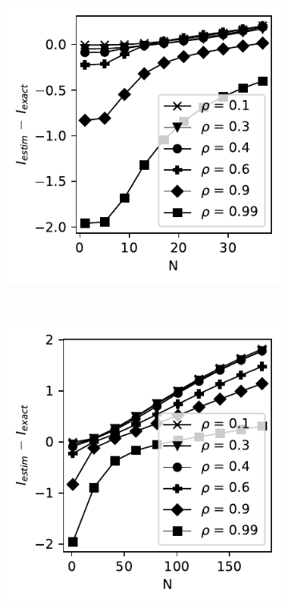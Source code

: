 \documentclass[../Thesis.tex]{subfiles}
\begin{document}
\begin{figure}[H]
    \centering
    \begin{subfigure}[t]{0.4\textwidth}
        \centering
        \includegraphics[width=\linewidth]{figures/ND examples/MI calc/gaussian example original zoom - B-spline - error.pdf}
        \caption{}
    \end{subfigure}%
    ~
    \begin{subfigure}[t]{0.4\textwidth}
        \centering
        \includegraphics[width=\linewidth]{figures/ND examples/MI calc/gaussian example original high corr - B-spline - error.pdf}

\end{subfigure}
\end{figure}
\end{document}
